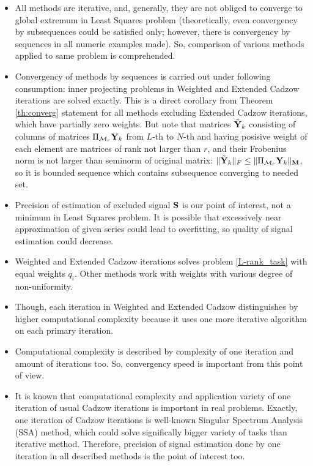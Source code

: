 \documentclass[12pt,a4paper,fleqn,leqno]{article}
\begin{document}
\begin{itemize}
\item
All methods are iterative, and, generally, they are not obliged to converge to global extremum in Least Squares problem (theoretically, even convergency by subsequences could be satisfied only; however, there is convergency by sequences in all numeric examples made). So, comparison of various methods applied to same problem is comprehended.
\item
Convergency of methods by sequences is carried out under following consumption: inner projecting problems in Weighted and Extended Cadzow iterations are solved exactly. This is a direct corollary from Theorem \ref{th:converg} statement for all methods excluding Extended Cadzow iterations, which have partially zero weights. But note that matrices $\tilde {\mathbf{Y}}_k$ consisting of columns of matrices $\Pi_{\mathcal{M}_r} \mathbf{Y}_k$ from $L$-th to $N$-th and having posisive weight of each element are matrices of rank not larger than $r$, and their Frobenius norm is not larger than seminorm of original matrix: $\|\tilde {\mathbf{Y}}_k\|_F \le \|\Pi_{\mathcal{M}_r} \mathbf{Y}_k\|_{\mathbf{M}}$, so it is bounded sequence which contains subsequence converging to needed set.
\item
Precision of estimation of excluded signal $\mathbf{S}$ is our point of interest, not a minimum in Least Squares problem. It is possible that excessively near approximation of given series could lead to overfitting, so quality of signal estimation could decrease.
\item
Weighted and Extended Cadzow iterations solves problem \eqref{L-rank_task} with equal weights $q_i$. Other methods work with weights with various degree of non-uniformity.
\item
Though, each iteration in Weighted and Extended Cadzow distinguishes by higher computational complexity because it uses one more iterative algorithm on each primary iteration.
\item
Computational complexity is described by complexity of one iteration and amount of iterations too. So, convergency speed is important from this point of view.
\item
It is known that computational complexity and application variety of one iteration of usual Cadzow iterations is important in real problems. Exactly, one iteration of Cadzow iterations is well-known Singular Spectrum Analysis (SSA) method, which could solve significally bigger variety of tasks than iterative method. Therefore, precision of signal estimation done by one iteration in all described methods is the point of interest too.

\end{itemize}
\end{document}
